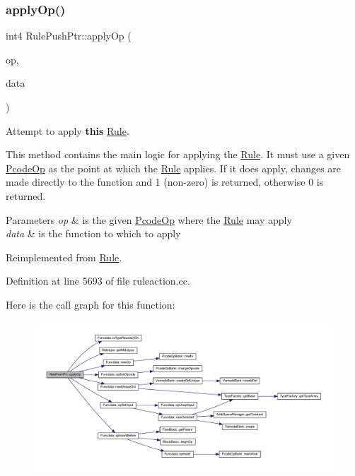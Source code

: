 \subsubsection{\texorpdfstring{applyOp()}{applyOp()}}
{\footnotesize\ttfamily int4 Rule\+Push\+Ptr\+::apply\+Op (\begin{DoxyParamCaption}\item[{\mbox{\hyperlink{class_pcode_op}{Pcode\+Op}} $\ast$}]{op,  }\item[{\mbox{\hyperlink{class_funcdata}{Funcdata}} \&}]{data }\end{DoxyParamCaption})\hspace{0.3cm}{\ttfamily [virtual]}}



Attempt to apply {\bfseries{this}} \mbox{\hyperlink{class_rule}{Rule}}. 

This method contains the main logic for applying the \mbox{\hyperlink{class_rule}{Rule}}. It must use a given \mbox{\hyperlink{class_pcode_op}{Pcode\+Op}} as the point at which the \mbox{\hyperlink{class_rule}{Rule}} applies. If it does apply, changes are made directly to the function and 1 (non-\/zero) is returned, otherwise 0 is returned. 
\begin{DoxyParams}{Parameters}
{\em op} & is the given \mbox{\hyperlink{class_pcode_op}{Pcode\+Op}} where the \mbox{\hyperlink{class_rule}{Rule}} may apply \\
\hline
{\em data} & is the function to which to apply \\
\hline
\end{DoxyParams}


Reimplemented from \mbox{\hyperlink{class_rule_a4e3e61f066670175009f60fb9dc60848}{Rule}}.



Definition at line 5693 of file ruleaction.\+cc.

Here is the call graph for this function\+:
\nopagebreak
\begin{figure}[H]
\begin{center}
\leavevmode
\includegraphics[width=350pt]{class_rule_push_ptr_a6785d1d9de50ecb56918711aa413d7dc_cgraph}
\end{center}
\end{figure}
\mbox{\label{class_rule_push_ptr_aff0b20b5e618f30ed4be5fb948766669}} 
